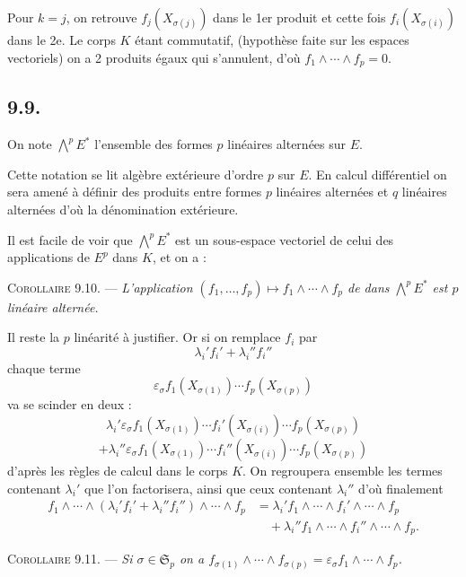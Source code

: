 Pour $k=j$, on retrouve $f_j(X_{\sigma(j)})$ dans le 1er produit et cette fois $f_i(X_{\sigma(i)})$ dans le 2e. Le corps $K$ étant commutatif, (hypothèse faite sur les espaces vectoriels) on a 2 produits égaux qui s'annulent, d'où $f_1\wedge\cdots\wedge f_p=0$. \bookend

\subsection*{9.9.}
On note $\bigwedge^pE^*$ l'ensemble des formes $p$ linéaires alternées sur $E$.

Cette notation se lit algèbre extérieure d'ordre $p$ sur $E$. En calcul différentiel on sera amené à définir des produits entre formes $p$ linéaires alternées et $q$ linéaires alternées d'où la dénomination extérieure.

Il est facile de voir que $\bigwedge^pE^*$ est un sous-espace vectoriel de celui des applications de $E^p$ dans $K$, et on a :

\medskip\noindent\textsc{Corollaire 9.10.} --- \emph{L'application $(f_1,\ldots,f_p)\longmapsto f_1\wedge\cdots\wedge f_p$ de  dans $\bigwedge^pE^*$ est $p$ linéaire alternée.}

Il reste la $p$ linéarité à justifier. Or si on remplace $f_i$ par
\[\lambda_i'f_i'+\lambda_i''f_i''\]
chaque terme
\[\varepsilon_\sigma f_1(X_{\sigma(1)})\cdots f_p(X_{\sigma(p)})\]
va se scinder en deux :
\[
\lambda_i'\varepsilon_\sigma f_1(X_{\sigma(1)})\cdots f_i'(X_{\sigma(i)})\cdots f_p(X_{\sigma(p)})
\]
\[
+\lambda_i''\varepsilon_\sigma f_1(X_{\sigma(1)})\cdots f_i''(X_{\sigma(i)})\cdots f_p(X_{\sigma(p)})
\]
d'après les règles de calcul dans le corps $K$. On regroupera ensemble les termes contenant $\lambda_i'$ que l'on factorisera, ainsi que ceux contenant $\lambda_i''$ d'où finalement
\begin{align*}
f_1\wedge\cdots\wedge(\lambda_i'f_i'+\lambda_i''f_i'')\wedge\cdots\wedge f_p
&=\lambda_i'f_1\wedge\cdots\wedge f_i'\wedge\cdots\wedge f_p\\
&\quad+\lambda_i''f_1\wedge\cdots\wedge f_i''\wedge\cdots\wedge f_p.
\end{align*}

\medskip\noindent\textsc{Corollaire 9.11.} --- \emph{Si $\sigma\in\mathfrak S_p$ on a $f_{\sigma(1)}\wedge\cdots\wedge f_{\sigma(p)}=\varepsilon_\sigma f_1\wedge\cdots\wedge f_p$.}

